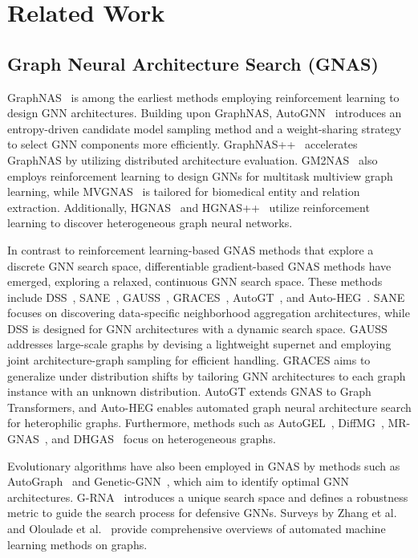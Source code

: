 \section{Related Work}
\subsection{Graph Neural Architecture Search (GNAS)} 

GraphNAS~\cite{DBLP:conf/ijcai/GaoYZ0H20} is among the earliest methods employing reinforcement learning to design GNN architectures. Building upon GraphNAS, AutoGNN~\cite{AutoGNN} introduces an entropy-driven candidate model sampling method and a weight-sharing strategy to select GNN components more efficiently. GraphNAS++~\cite{gao2022graphnas++} accelerates GraphNAS by utilizing distributed architecture evaluation. GM2NAS~\cite{gao2023gm2nas} also employs reinforcement learning to design GNNs for multitask multiview graph learning, while MVGNAS~\cite{al2022multi} is tailored for biomedical entity and relation extraction. Additionally, HGNAS~\cite{DBLP:conf/icdm/GaoZLZLH21} and HGNAS++~\cite{gao2023hgnas++} utilize reinforcement learning to discover heterogeneous graph neural networks.

In contrast to reinforcement learning-based GNAS methods that explore a discrete GNN search space, differentiable gradient-based GNAS methods have emerged, exploring a relaxed, continuous GNN search space. These methods include DSS~\cite{li2021one}, SANE~\cite{DBLP:conf/icde/ZhaoYT21}, GAUSS~\cite{guan2022large}, GRACES~\cite{qin2022graph}, AutoGT~\cite{zhang2022autogt}, and Auto-HEG~\cite{zheng2023auto}. SANE focuses on discovering data-specific neighborhood aggregation architectures, while DSS is designed for GNN architectures with a dynamic search space. GAUSS addresses large-scale graphs by devising a lightweight supernet and employing joint architecture-graph sampling for efficient handling. GRACES aims to generalize under distribution shifts by tailoring GNN architectures to each graph instance with an unknown distribution. AutoGT extends GNAS to Graph Transformers, and Auto-HEG enables automated graph neural architecture search for heterophilic graphs. Furthermore, methods such as AutoGEL~\cite{wang2021autogel}, DiffMG~\cite{diffmg}, MR-GNAS~\cite{Zheng2022MultiRelationalGN}, and DHGAS~\cite{Zhang_Zhang_Wang_Qin_Qin_Zhu_2023} focus on heterogeneous graphs.

Evolutionary algorithms have also been employed in GNAS by methods such as AutoGraph~\cite{li2020autograph} and Genetic-GNN~\cite{Shi2020EvolutionaryAS}, which aim to identify optimal GNN architectures. G-RNA~\cite{DBLP:conf/cvpr/XieCZWWZY023} introduces a unique search space and defines a robustness metric to guide the search process for defensive GNNs. Surveys by Zhang et al.~\cite{DBLP:conf/ijcai/ZhangW021} and Oloulade et al.~\cite{oloulade2021graph} provide comprehensive overviews of automated machine learning methods on graphs.

